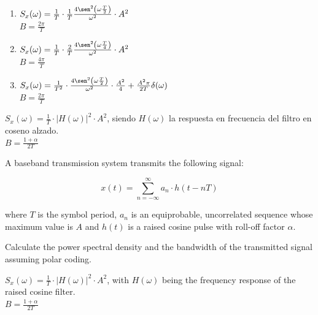 \documentclass[es,boletin]{uah}
\begin{document}
{
	\begin{enumerate}
		\item $S_x(\omega) = \frac{1}{T} \cdot \frac{1}{T} \frac{4 \sen^2\left ( \omega \frac{T}{2}\right )}{\omega^2} \cdot A^2$ \\
				$B = \frac{2\pi}{T}$
		\item $S_x(\omega) = \frac{1}{T} \cdot \frac{2}{T} \frac{4 \sen^2\left ( \omega \frac{T}{4}\right )}{\omega^2} \cdot A^2$ \\
				$B = \frac{4\pi}{T}$
		\item $S_x(\omega) = \frac{1}{T^2} \cdot \frac{4 \sen^2\left ( \omega \frac{T}{2}\right )}{\omega^2} \cdot \frac{A^2}{4} + \frac{A^2 \pi}{2T} \delta(\omega)$ \\
				$B = \frac{2\pi}{T}$
	\end{enumerate}
}


{
	$S_x(\omega) = \frac{1}{T} \cdot |H(\omega)|^2 \cdot A^2$, siendo $H(\omega)$ la respuesta en frecuencia del filtro en coseno alzado. \\
			$B = \frac{1+\alpha}{2T}$
}
{
	A baseband transmission system transmits the following signal:

	\begin{displaymath}
		x(t) = \sum_{n=-\infty}^{\infty} a_n \cdot h(t-nT)
	\end{displaymath}
	
	where $T$ is the symbol period, $a_n$ is an equiprobable, uncorrelated sequence whose maximum value is $A$ and $h(t)$ is a raised cosine pulse with roll-off factor $\alpha$. 
	
	Calculate the power spectral density and the bandwidth of the transmitted signal assuming polar coding.
	
}
{
	$S_x(\omega) = \frac{1}{T} \cdot |H(\omega)|^2 \cdot A^2$, with $H(\omega)$ being the frequency response of the raised cosine filter. \\
				$B = \frac{1+\alpha}{2T}$

}
\end{document}
